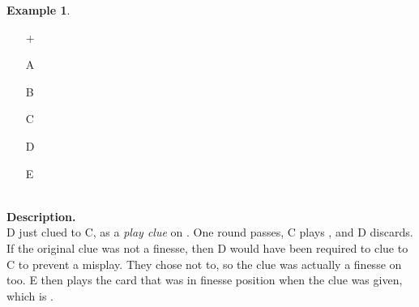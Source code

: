 \documentclass[a4paper]{article}
\theoremstyle{plain}
\theoremstyle{definition}
\newtheorem{example}[theorem]{Example}
\begin{document}
\begin{example}	\hfill \\
	\begin{minipage}{0.45\textwidth}
		\begin{itemize}
			\item[\Large +]      
			\item[\Large A]    
			\item[\Large B]    
			\item[\Large C]    
			\item[\Large D]    
			\item[\Large E]    
		\end{itemize}
	\end{minipage}%
	\begin{minipage}{0.55\textwidth}
		\hfill \\
		
		\textbf{Description.} \\
		
		D just clued  to C, as a \emph{play clue} on . One round passes, C plays , and D discards. If the original  clue was not a finesse, then D would have been required to clue  to C to prevent a misplay. They chose not to, so the clue was actually a finesse on  too. E then plays the card that was in finesse position when the  clue was given, which is .
	\end{minipage}
\end{example} \vspace{0.15 cm}
\end{document}
